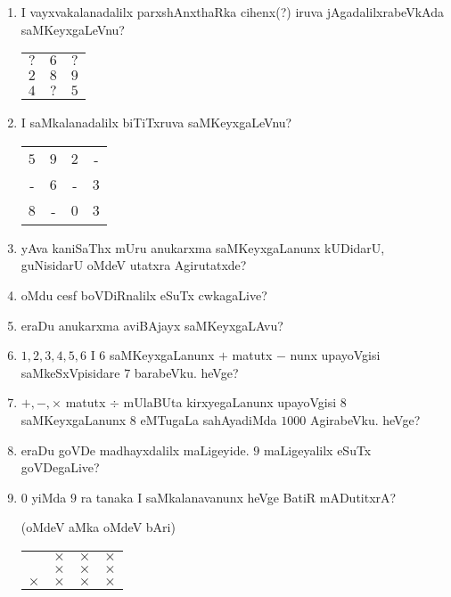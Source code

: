\begin{enumerate}
\item I vayxvakalanadalilx parxshAnxthaRka cihenx(?) iruva jAgadalilxrabeVkAda saMKeyxgaLeVnu?
\begin{center}
\begin{tabular}{ccc}
$?$ & $6$ & $?$\\
$2$ & $8$ & $9$\\
\hline
$4$ & $?$ & $5$
\end{tabular}
\end{center}

\newpage

\item I saMkalanadalilx \underline{\qquad} biTiTxruva saMKeyxgaLeVnu?
\begin{center}
\begin{tabular}{cccc}
$5$ & $9$ & $2$ & -\\
- & $6$ & - & $3$\\
\hline
$8$ & - & $0$ & $3$
\end{tabular}
\end{center}

\item yAva kaniSaThx mUru anukarxma saMKeyxgaLanunx kUDidarU, guNisidarU oMdeV utatxra Agirutatxde?

\item oMdu cesf boVDiRnalilx eSuTx cwkagaLive?

\item eraDu anukarxma aviBAjayx saMKeyxgaLAvu?

\item $1,2,3,4,5,6$ I $6$ saMKeyxgaLanunx $+$ matutx $-$ nunx upayoVgisi saMkeSxVpisidare $7$ barabeVku. heVge?

\item $+,-,\times$ matutx $\div$ mUlaBUta kirxyegaLanunx upayoVgisi $8$ saMKeyxgaLanunx $8$ eMTugaLa sahAyadiMda $1000$ AgirabeVku. heVge?

\item eraDu goVDe madhayxdalilx maLigeyide. $9$ maLigeyalilx eSuTx goVDegaLive?

\item $0$ yiMda $9$ ra tanaka I saMkalanavanunx heVge BatiR mADutitxrA?

(oMdeV aMka oMdeV bAri)
\begin{center}
\begin{tabular}{cccc}
 & $\times$ & $\times$ & $\times$\\
 & $\times$ & $\times$ & $\times$\\
\hline
$\times$ & $\times$ & $\times$ & $\times$\\
\end{tabular}
\end{center}


\end{enumerate}
